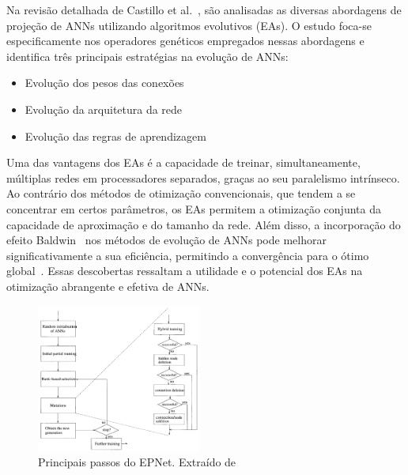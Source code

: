 \documentclass[conference]{IEEEtran}
\begin{document}
Na revisão detalhada de Castillo et al.~\cite{Castillo2003ArtificialAlgorithms}, são analisadas as diversas abordagens de projeção de ANNs utilizando algoritmos evolutivos (EAs). O estudo foca-se especificamente nos operadores genéticos empregados nessas abordagens e identifica três principais estratégias na evolução de ANNs:
\begin{itemize}
    \item Evolução dos pesos das conexões
    \item Evolução da arquitetura da rede
    \item Evolução das regras de aprendizagem
\end{itemize}

Uma das vantagens dos EAs é a capacidade de treinar, simultaneamente, múltiplas redes em processadores separados, graças ao seu paralelismo intrínseco. Ao contrário dos métodos de otimização convencionais, que tendem a se concentrar em certos parâmetros, os EAs permitem a otimização conjunta da capacidade de aproximação e do tamanho da rede. Além disso, a incorporação do efeito Baldwin~\cite{Downing2010TheNetworks} nos métodos de evolução de ANNs pode melhorar significativamente a sua eficiência, permitindo a convergência para o ótimo global~\cite{Castillo2003ArtificialAlgorithms}. Essas descobertas ressaltam a utilidade e o potencial dos EAs na otimização abrangente e efetiva de ANNs.

\begin{figure}[htbp]
    \centering
    \includegraphics[width=0.48\textwidth]{imagens/evo_alg2.png}
    \caption{Principais passos do EPNet. Extraído de ~\cite{Yao1997ANetworks}}
    \label{fig:epnet}
\end{figure}
\end{document}
